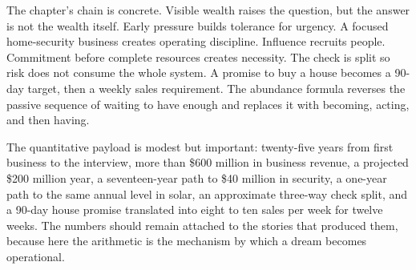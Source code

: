 The chapter's chain is concrete. Visible wealth raises the question, but the answer is not the wealth itself. Early pressure builds tolerance for urgency. A focused home-security business creates operating discipline. Influence recruits people. Commitment before complete resources creates necessity. The check is split so risk does not consume the whole system. A promise to buy a house becomes a 90-day target, then a weekly sales requirement. The abundance formula reverses the passive sequence of waiting to have enough and replaces it with becoming, acting, and then having.

The quantitative payload is modest but important: twenty-five years from first business to the interview, more than \$600 million in business revenue, a projected \$200 million year, a seventeen-year path to \$40 million in security, a one-year path to the same annual level in solar, an approximate three-way check split, and a 90-day house promise translated into eight to ten sales per week for twelve weeks. The numbers should remain attached to the stories that produced them, because here the arithmetic is the mechanism by which a dream becomes operational.